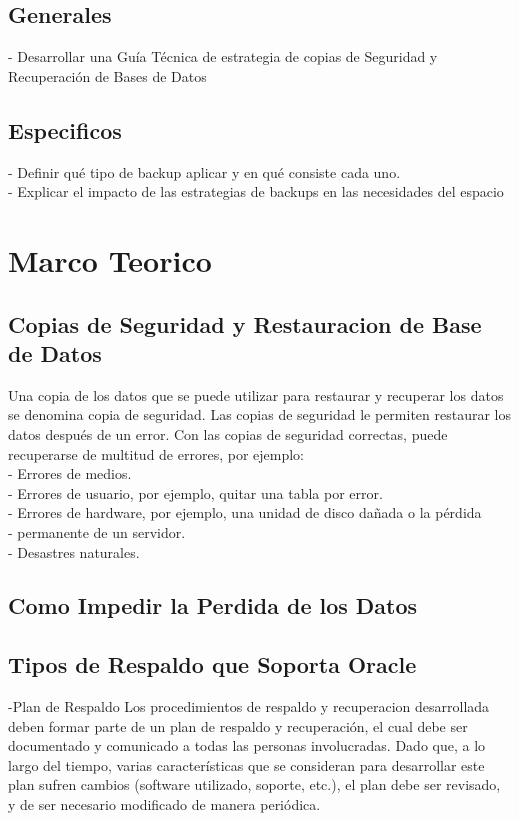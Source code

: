 \documentclass[12pt,letterpaper]{article}
\begin{document}
\subsection{Generales}
- Desarrollar una Guía Técnica de estrategia de copias de Seguridad y Recuperación de Bases de Datos
\subsection{Especificos}
- Definir qué tipo de backup aplicar y en qué consiste cada uno.\\
- Explicar el impacto de las estrategias de backups en las necesidades del espacio\\

\newpage
\section{Marco Teorico}
\subsection{Copias de Seguridad y Restauracion de Base de Datos}
Una copia de los datos que se puede utilizar para restaurar y recuperar los datos se denomina copia de seguridad. Las copias de seguridad le permiten restaurar los datos después de un error. Con las copias de seguridad correctas, puede recuperarse de multitud de errores, por ejemplo:  \\
- Errores de medios. \\ 
- Errores de usuario, por ejemplo, quitar una tabla por error. \\
- Errores de hardware, por ejemplo, una unidad de disco dañada o la pérdida \\
- permanente de un servidor. \\
- Desastres naturales. \\

\subsection{Como Impedir la Perdida de los Datos}

\subsection{Tipos de Respaldo que Soporta Oracle}


-Plan de Respaldo  
Los procedimientos de respaldo y recuperacion desarrollada deben formar parte de un plan de respaldo y recuperación, el cual debe ser documentado y comunicado a todas las personas involucradas. Dado que, a lo largo del tiempo, varias características que se consideran para desarrollar este plan sufren cambios (software utilizado, soporte,
etc.), el plan debe ser revisado, y de ser necesario modificado de manera periódica. 
 
\end{document}
